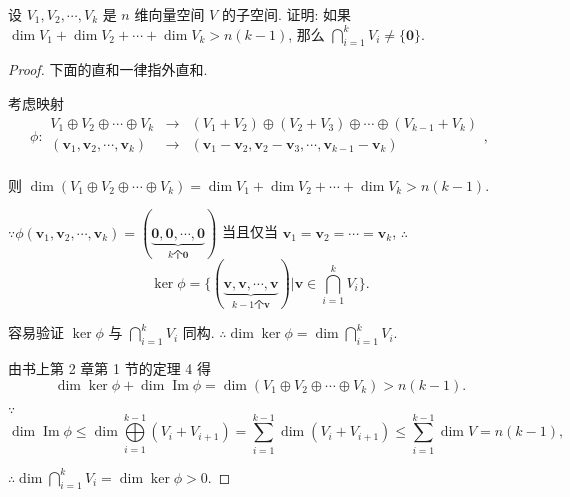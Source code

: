 \documentclass{ctexart}
\begin{document}
\addtocounter{exercise}{2}
\begin{exercise}%
    设 $V_1,V_2,\cdots,V_k$ 是 $n$ 维向量空间 $V$ 的子空间. 证明: 如果 $\dim V_1+\dim V_2+\cdots+\dim V_k>n(k-1)$, 那么 $\bigcap\limits_{i=1}^kV_i\neq\{\boldsymbol{0}\}$.
\end{exercise}
\begin{proof}
    下面的直和一律指外直和.

    考虑映射
    \[\phi:\begin{array}{rcl}
        V_1\oplus V_2\oplus\cdots\oplus V_k & \to & (V_1+V_2)\oplus(V_2+V_3)\oplus\cdots\oplus(V_{k-1}+V_k) \\
        (\boldsymbol{v}_1,\boldsymbol{v}_2,\cdots,\boldsymbol{v}_k) & \to & (\boldsymbol{v}_1-\boldsymbol{v}_2,\boldsymbol{v}_2-\boldsymbol{v}_3,\cdots,\boldsymbol{v}_{k-1}-\boldsymbol{v}_k) \\
    \end{array},\]

    则 $\dim(V_1\oplus V_2\oplus\cdots\oplus V_k)=\dim V_1+\dim V_2+\cdots+\dim V_k>n(k-1)$.

    $\because\phi(\boldsymbol{v}_1,\boldsymbol{v}_2,\cdots,\boldsymbol{v}_k)=(\underbrace{\boldsymbol{0},\boldsymbol{0},\cdots,\boldsymbol{0}}_{k\text{个}\boldsymbol{0}})$ 当且仅当 $\boldsymbol{v}_1=\boldsymbol{v}_2=\cdots=\boldsymbol{v}_k$, $\therefore$
    \[\ker\phi=\bigg\{(\underbrace{\boldsymbol{v},\boldsymbol{v},\cdots,\boldsymbol{v}}_{k-1\text{个}\boldsymbol{v}})\bigg|\boldsymbol{v}\in\bigcap\limits_{i=1}^kV_i\bigg\}.\]

    容易验证 $\ker\phi$ 与 $\bigcap\limits_{i=1}^kV_i$ 同构. $\therefore\dim\ker\phi=\dim\bigcap\limits_{i=1}^kV_i$.

    由书上第 2 章第 1 节的定理 4 得
    \[\dim\ker\phi+\dim\operatorname{Im}\phi=\dim(V_1\oplus V_2\oplus\cdots\oplus V_k)>n(k-1).\]

    $\because$
    \[\dim\operatorname{Im}\phi\leq\dim\bigoplus\limits_{i=1}^{k-1}(V_i+V_{i+1})=\sum\limits_{i=1}^{k-1}\dim(V_i+V_{i+1})\leq\sum\limits_{i=1}^{k-1}\dim V=n(k-1),\]

    $\therefore\dim\bigcap\limits_{i=1}^kV_i=\dim\ker\phi>0$.
\end{proof}
\end{document}
